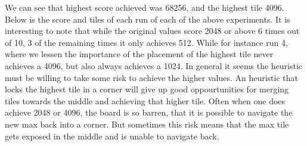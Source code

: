 We can see that highest score achieved was 68256, and the highest tile 4096. Below
is the score and tiles of each run of each of the above experiments. It is interesting
to note that while the original values score 2048 or above 6 times out of 10, 3 of the
remaining times it only achieves 512. While for instance run 4, where we lessen the
importance of the placement of the highest tile never achieves a 4096, but also always
achieves a 1024. In general it seems the heuristic must be willing to take some risk
to achieve the higher values. An heuristic that locks the highest tile in a corner
will give up good oppourtunities for merging tiles towards the middle and achieving
that higher tile. Often when one does achieve 2048 or 4096, the board is so barren,
that it is possible to navigate the new max back into a corner. But sometimes this
risk means that the max tile gets exposed in the middle and is unable to navigate back.

